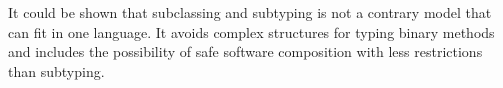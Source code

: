 It could be shown that subclassing and subtyping is not a contrary model
that can fit in one language. It avoids complex structures for typing
binary methods and includes the possibility of safe software composition
with less restrictions than subtyping.



%
